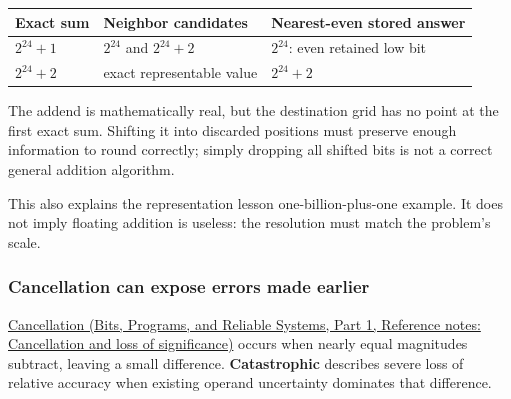 {\def\LTcaptype{none} %
\begin{longtable}[]{@{}
  >{\raggedright\arraybackslash}p{}
  >{\raggedright\arraybackslash}p{}
  >{\raggedright\arraybackslash}p{}@{}}
\toprule\noalign{}
\begin{minipage}[b]{\linewidth}\raggedright
Exact sum
\end{minipage} & \begin{minipage}[b]{\linewidth}\raggedright
Neighbor candidates
\end{minipage} & \begin{minipage}[b]{\linewidth}\raggedright
Nearest-even stored answer
\end{minipage} \\
\midrule\noalign{}
\endhead
\bottomrule\noalign{}
\endlastfoot
\(2^{24}+1\) & \(2^{24}\) and \(2^{24}+2\) & \(2^{24}\): even retained low bit \\
\(2^{24}+2\) & exact representable value & \(2^{24}+2\) \\
\end{longtable}
}

The addend is mathematically real, but the destination grid has no point at the first exact sum. Shifting it into discarded positions must preserve enough information to round correctly; simply dropping all shifted bits is not a correct general addition algorithm.

This also explains the representation lesson one-billion-plus-one example. It does not imply floating addition is useless: the resolution must match the problem's scale.

\subsubsection{Cancellation can expose errors made earlier}\label{05-engine-i-ch001-cancellation-can-expose-errors-made-earlier}

\hypertarget{05-engine-i-ch001-cancellation-can-expose-errors-made-earlier}{}

\href{../01-Bits-Programs-and-Reliable-Systems-P01/main.pdf\#appendix-a2773a6a2f9d}{Cancellation (Bits, Programs, and Reliable Systems, Part 1, Reference notes: Cancellation and loss of significance)} occurs when nearly equal magnitudes subtract, leaving a small difference. \textbf{Catastrophic} describes severe loss of relative accuracy when existing operand uncertainty dominates that difference.

